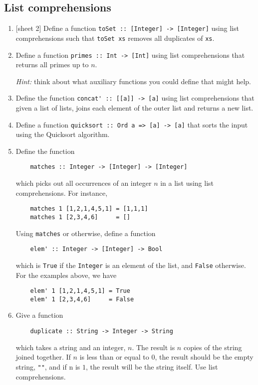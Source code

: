 \documentclass{article}
\begin{document}
\subsection{List comprehensions}
\begin{enumerate}
\item {[sheet 2]} Define a function \verb|toSet :: [Integer] -> [Integer]| using list comprehensions such that \verb|toSet xs| removes all duplicates of \verb|xs|.

\item Define a function \verb|primes :: Int -> [Int]| using list comprehensions that returns all primes up to $n$. \par
\textit{Hint:} think about what auxiliary functions you could define that might help.

\item Define the function \verb|concat' :: [[a]] -> [a]| using list comprehensions that given a list of lists, joins each element of the outer list and returns a new list.

\item Define a function \verb|quicksort :: Ord a => [a] -> [a]| that sorts the input using the Quicksort algorithm.

\item \cite[p. 115]{thompson} Define the function
\begin{verbatim}
    matches :: Integer -> [Integer] -> [Integer]
\end{verbatim}
which picks out all occurrences of an integer $n$ in a list using list comprehensions. For instance,
\begin{verbatim}
    matches 1 [1,2,1,4,5,1] = [1,1,1]
    matches 1 [2,3,4,6]     = []
\end{verbatim}
Using \verb|matches| or otherwise, define a function
\begin{verbatim}
    elem' :: Integer -> [Integer] -> Bool
\end{verbatim}
which is \verb|True| if the \verb|Integer| is an element of the list, and \verb|False| otherwise. For the examples above, we have
\begin{verbatim}
    elem' 1 [1,2,1,4,5,1] = True
    elem' 1 [2,3,4,6]     = False
\end{verbatim}

\item \cite[p. 115]{thompson} Give a function
\begin{verbatim}
    duplicate :: String -> Integer -> String
\end{verbatim}
which takes a string and an integer, $n$. The result is $n$ copies of the string joined together. If $n$ is less than or equal to $0$, the result should be the empty string, \verb|""|, and if n is $1$, the result will be the string itself. Use list comprehensions.


\end{enumerate}
\end{document}
